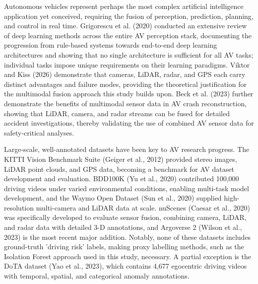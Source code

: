 \documentclass[11pt,a4paper]{article}
\begin{document}
Autonomous vehicles represent perhaps the most complex artificial intelligence application yet conceived, requiring the fusion of perception, prediction, planning, and control in real time. Grigorescu et al. (2020) conducted an extensive review of deep learning methods across the entire AV perception stack, documenting the progression from rule-based systems towards end-to-end deep learning architectures and showing that no single architecture is sufficient for all AV tasks; individual tasks impose unique requirements on their learning paradigms. Viktor and Kiss (2026) demonstrate that cameras, LiDAR, radar, and GPS each carry distinct advantages and failure modes, providing the theoretical justification for the multimodal fusion approach this study builds upon. Beck et al. (2023) further demonstrate the benefits of multimodal sensor data in AV crash reconstruction, showing that LiDAR, camera, and radar streams can be fused for detailed accident investigations, thereby validating the use of combined AV sensor data for safety-critical analyses.

Large-scale, well-annotated datasets have been key to AV research progress. The KITTI Vision Benchmark Suite (Geiger et al., 2012) provided stereo images, LiDAR point clouds, and GPS data, becoming a benchmark for AV dataset development and evaluation. BDD100K (Yu et al., 2020) contributed 100,000 driving videos under varied environmental conditions, enabling multi-task model development, and the Waymo Open Dataset (Sun et al., 2020) supplied high-resolution multi-camera and LiDAR data at scale. nuScenes (Caesar et al., 2020) was specifically developed to evaluate sensor fusion, combining camera, LiDAR, and radar data with detailed 3-D annotations, and Argoverse 2 (Wilson et al., 2023) is the most recent major addition. Notably, none of these datasets includes ground-truth 'driving risk' labels, making proxy labelling methods, such as the Isolation Forest approach used in this study, necessary. A partial exception is the DoTA dataset (Yao et al., 2023), which contains 4,677 egocentric driving videos with temporal, spatial, and categorical anomaly annotations.
\end{document}
